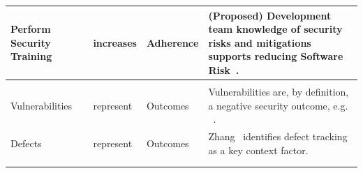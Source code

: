 \begin{table}[!htbp]
\begin{scriptsize}
\begin{tabular}{p{1.75cm}p{1cm}p{1cm}p{6cm}}
			Perform Security Training &	increases &	Adherence	& (Proposed) Development team knowledge of security risks and mitigations supports reducing Software Risk~\cite{morrison2017surveying}.\\		
			\hline \\[-1.8ex] 
			Vulnerabilities	& represent & Outcomes &  Vulnerabilities are, by definition, a negative security outcome, e.g. ~\cite{alhazmi2007measuring}.\\
			Defects & represent & Outcomes	& Zhang~\cite{zhang2014towards} identifies defect tracking as a key context factor.\\		
			\hline \\[-1.8ex] 
			\hline \\[-1.8ex] 
		\end{tabular} 
	\end{scriptsize}
\end{table} 
